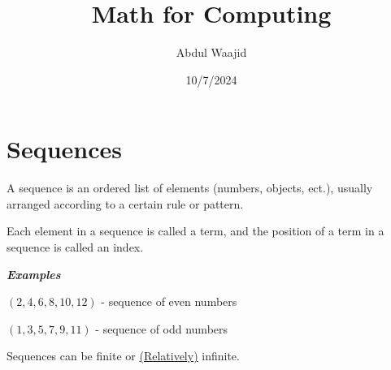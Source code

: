 \documentclass[]{article}
\title{Math for Computing}
\author{Abdul Waajid}
\date{10/7/2024}
\begin{document}
\maketitle

\section{Sequences}

A sequence is an ordered list of elements (numbers, objects, ect.), usually arranged according to a certain rule or pattern.

Each element in a sequence is called a term, and the position of a term in a sequence is called an index.

\textbf{\textit{Examples}}

$(2, 4, 6, 8, 10, 12)$ - sequence of even numbers

$(1, 3, 5, 7, 9, 11)$ - sequence of odd numbers

Sequences can be finite or \href{https://chatgpt.com/share/67036ea9-4ee4-8013-807b-503ab41d091b}{(Relatively)} infinite.
\end{document}
